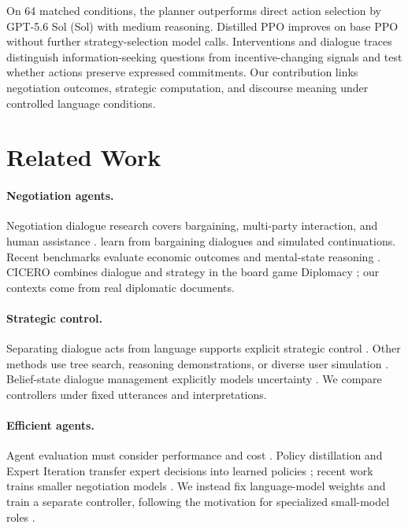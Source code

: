 \documentclass[11pt]{article}
\begin{document}
On 64 matched conditions, the planner outperforms direct action selection by GPT-5.6 Sol (Sol) with medium reasoning. Distilled PPO improves on base PPO without further strategy-selection model calls. Interventions and dialogue traces distinguish information-seeking questions from incentive-changing signals and test whether actions preserve expressed commitments. Our contribution links negotiation outcomes, strategic computation, and discourse meaning under controlled language conditions.

\section{Related Work}
\paragraph{Negotiation agents.}
Negotiation dialogue research covers bargaining, multi-party interaction, and human assistance \citep{zhan2024survey,lin2024decision}. \citet{lewis-etal-2017-deal} learn from bargaining dialogues and simulated continuations. Recent benchmarks evaluate economic outcomes and mental-state reasoning \citep{bianchi2024negotiationarena,abdelnabi2024stakeholders,chan2024negotiationtom}. CICERO combines dialogue and strategy in the board game Diplomacy \citep{fair2022cicero}; our contexts come from real diplomatic documents.

\paragraph{Strategic control.}
Separating dialogue acts from language supports explicit strategic control \citep{he-etal-2018-decoupling,deng2024ppdpp,liu-etal-2025-dual}. Other methods use tree search, reasoning demonstrations, or diverse user simulation \citep{yu-etal-2023-prompt,gandhi2023strategic,zhang2024trip}. Belief-state dialogue management explicitly models uncertainty \citep{young2013pomdp}. We compare controllers under fixed utterances and interpretations.

\paragraph{Efficient agents.}
Agent evaluation must consider performance and cost \citep{kapoor2024agents,hakimov2026price}. Policy distillation and Expert Iteration transfer expert decisions into learned policies \citep{rusu2016distillation,anthony2017expert}; recent work trains smaller negotiation models \citep{hua2026socialrl,tabacof2026negotiate}. We instead fix language-model weights and train a separate controller, following the motivation for specialized small-model roles \citep{belcak2025small}.









\clearpage
\appendix


\end{document}
